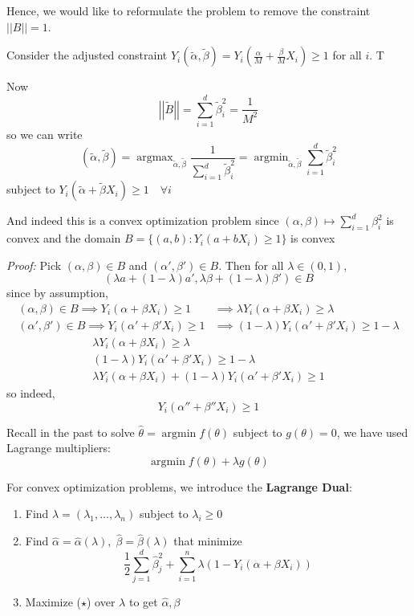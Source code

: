 \documentclass[12pt]{report}
\renewcommand{\hat}[1]{\widehat{#1}}
\newcommand{\norm}[1]{\left\vert\left\vert #1 \right\vert\right\vert}
\newcommand*{\tbf}[1]{\ifmmode\mathbf{#1}\else\textbf{#1}\fi}
\DeclareMathOperator*{\argmax}{\arg\max}
\DeclareMathOperator*{\argmin}{\arg\min}
\newenvironment*{proof}[1][blue]{
\begin{tcolorbox}[
    parbox=false,
    colback=#1!5!white,
    colframe=#1!75!black,
    breakable
]}
{\end{tcolorbox}}
\begin{document}
Hence, we would like to reformulate the problem to remove the constraint $\norm B = 1$.

Consider the adjusted constraint $Y_i(\tilde \alpha, \tilde \beta) = Y_i(\frac{\alpha}{M} + \frac{\beta}{M} X_i) \geq 1$ for all $i$. T

Now
\[\norm{\tilde B} = \sum_{i=1}^{d} \tilde \beta_i^2 = \frac{1}{M^2}\]
so we can write
\[(\tilde \alpha, \tilde \beta) = \argmax_{\tilde \alpha, \tilde \beta} \frac{1}{\sum_{i=1}^{d} \tilde \beta_i^2 } = \argmin_{\tilde \alpha, \tilde \beta} \sum_{i=1}^{d} \tilde \beta_i^2 \]
subject to $Y_i(\tilde \alpha + \tilde \beta X_i) \geq 1\quad \forall i$

And indeed this is a convex optimization problem since $(\alpha, \beta) \mapsto \sum_{i=1}^d \beta_i^2$ is convex and the domain $B= \{(a, b): Y_i(a + b X_i) \geq 1\}$ is convex

\begin{proof}
    \emph{Proof:} Pick $(\alpha, \beta) \in B$ and $(\alpha', \beta') \in B$. Then for all $\lambda \in (0, 1)$,
    \[(\lambda a + (1-\lambda)a', \lambda \beta + (1- \lambda)\beta') \in B\]
    since by assumption,
    \begin{align*}
        (\alpha, \beta) \in B \implies Y_i(\alpha + \beta X_i) \geq 1     & \implies \lambda Y_i(\alpha + \beta X_i) \geq \lambda         \\
        (\alpha', \beta') \in B \implies Y_i(\alpha' + \beta' X_i) \geq 1 & \implies (1-\lambda) Y_i(\alpha' + \beta' X_i) \geq 1-\lambda
    \end{align*}
    \[\begin{array}{rl}
            \lambda Y_i(\alpha + \beta X_i) \geq \lambda         \\
            (1-\lambda) Y_i(\alpha' + \beta' X_i) \geq 1-\lambda \\ \hline
            \lambda Y_i(\alpha + \beta X_i) + (1-\lambda) Y_i(\alpha' + \beta' X_i) \geq 1
        \end{array}\]
    so indeed,
    \[Y_i(\alpha'' + \beta'' X_i) \geq 1\]
\end{proof}

Recall in the past to solve $\hat \theta = \argmin f(\theta)$ subject to $g(\theta) = 0$, we have used Lagrange multipliers:
\[\argmin f(\theta) + \lambda g(\theta)\]

For convex optimization problems, we introduce the \tbf{Lagrange Dual}:
\begin{enumerate}
    \item Find $\lambda = (\lambda_1, \dots, \lambda_n)$ subject to $\lambda_i \geq 0$
    \item Find $\hat \alpha = \hat \alpha(\lambda),\; \hat \beta = \hat \beta(\lambda)$ that minimize
          \[\frac{1}{2}\sum_{j=1}^d \hat \beta_j^2 + \sum_{i=1}^n \lambda (1 - Y_i(\alpha + \beta X_i)) \tag{$\star$}\]
    \item Maximize ($\star$) over $\lambda$ to get $\hat \alpha, \beta$
\end{enumerate}
\end{document}
